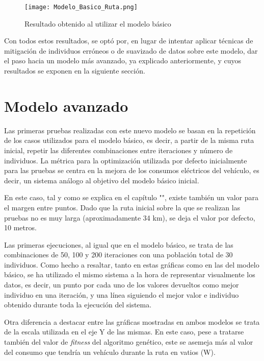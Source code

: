 \documentclass[11pt,spanish,listoffigures,listoftables]{tfgetsinf}
\begin{document}
\begin{figure}[!htb]
    \centering
    \texttt{[image: Modelo\_Basico\_Ruta.png]}
    \caption{Resultado obtenido al utilizar el modelo básico}
    \label{fig:basic_model_results}
\end{figure}

Con todos estos resultados, se optó por, en lugar de intentar aplicar técnicas de mitigación de individuos erróneos o de suavizado de datos sobre este modelo, dar el paso hacia un modelo más avanzado, ya explicado anteriormente, y cuyos resultados se exponen en la siguiente sección.

\newpage
\section{Modelo avanzado}
Las primeras pruebas realizadas con este nuevo modelo se basan en la repetición de los casos utilizados para el modelo básico, es decir, a partir de la misma ruta inicial, repetir las diferentes combinaciones entre iteraciones y número de individuos. La métrica para la optimización utilizada por defecto inicialmente para las pruebas se centra en la mejora de los consumos eléctricos del vehículo, es decir, un sistema análogo al objetivo del modelo básico inicial.

En este caso, tal y como se explica en el capítulo "", existe también un valor para el margen entre puntos. Dado que la ruta inicial sobre la que se realizan las pruebas no es muy larga (aproximadamente 34 km), se deja el valor por defecto, 10 metros.

Las primeras ejecuciones, al igual que en el modelo básico, se trata de las combinaciones de 50, 100 y 200 iteraciones con una población total de 30 individuos. Como hecho a resaltar, tanto en estas gráficas como en las del modelo básico, se ha utilizado el mismo sistema a la hora de representar visualmente los datos, es decir, un punto por cada uno de los valores devueltos como mejor individuo en una iteración, y una línea siguiendo el mejor valor e individuo obtenido durante toda la ejecución del sistema.

Otra diferencia a destacar entre las gráficas mostradas en ambos modelos se trata de la escala utilizada en el eje Y de las mismas. En este caso, pese a tratarse también del valor de \textit{fitness} del algoritmo genético, este se asemeja más al valor del consumo que tendría un vehículo durante la ruta en vatios (W).
\end{document}
